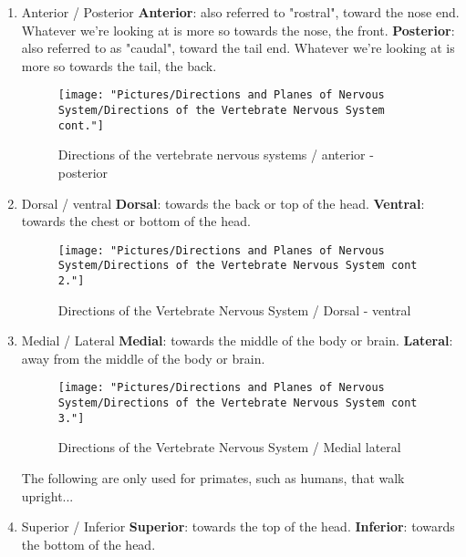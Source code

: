 \documentclass[12pt,a4paper]{article}
\begin{document}
	\begin{enumerate}
		\item Anterior / Posterior
		\subitem \textbf{Anterior}: also referred to "rostral", toward the nose end. 
		\subsubitem Whatever we're looking at is more so towards the nose, the front. 
		\subitem \textbf{Posterior}: also referred to as "caudal", toward the tail end. 
		\subsubitem Whatever we're looking at is more so towards the tail, the back. 
		
		
\begin{figure}
	\centering
	\texttt{[image: "Pictures/Directions and Planes of Nervous System/Directions of the Vertebrate Nervous System cont."]}
	\caption{Directions of the vertebrate nervous systems / anterior - posterior}
	\label{fig:directions-of-the-vertebrate-nervous-system-cont}
\end{figure}
		
		\item Dorsal / ventral
		\subitem \textbf{Dorsal}: towards the back or top of the head. 
		\subitem \textbf{Ventral}: towards the chest or bottom of the head. 
		
\begin{figure}
	\centering
	\texttt{[image: "Pictures/Directions and Planes of Nervous System/Directions of the Vertebrate Nervous System cont 2."]}
	\caption{Directions of the Vertebrate Nervous System / Dorsal - ventral}
	\label{fig:directions-of-the-vertebrate-nervous-system-cont-2}
\end{figure}
		
		
		\item Medial / Lateral 
		\subitem \textbf{Medial}: towards the middle of the body or brain. 
		\subitem \textbf{Lateral}: away from the middle of the body or brain. 
		
\begin{figure}
	\centering
	\texttt{[image: "Pictures/Directions and Planes of Nervous System/Directions of the Vertebrate Nervous System cont 3."]}
	\caption{Directions of the Vertebrate Nervous System / Medial lateral}
	\label{fig:directions-of-the-vertebrate-nervous-system-cont-3}
\end{figure}
		
		The following are only used for primates, such as humans, that walk upright...
		
		\item Superior / Inferior 
		\subitem \textbf{Superior}: towards the top of the head. 
		\subitem \textbf{Inferior}: towards the bottom of the head. 
		

\end{enumerate}
\end{document}
